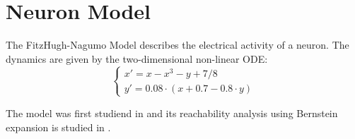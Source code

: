 \section{Neuron Model}
The FitzHugh-Nagumo Model describes the electrical activity of a neuron. The dynamics are given by the two-dimensional non-linear ODE:
\begin{equation}
  \begin{cases}
  x' = x - x^3 - y + 7/8 \\
  y' = 0.08\cdot(x + 0.7 - 0.8\cdot y)
  \end{cases}
 \end{equation}

\noindent The model was first studiend in \cite{fitzhugh1961impulses} and its reachability analysis using Bernstein expansion is studied in \cite{dang2012reachability}.
